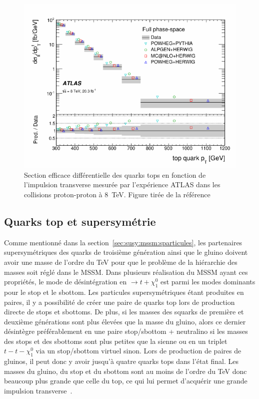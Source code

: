 \begin{figure}
  \centering
  \includegraphics{boosted_top_pt.pdf}
  \caption{Section efficace différentielle des quarks tops en fonction
    de l'impulsion transverse mesurée par l'expérience ATLAS dans les
    collisions proton-proton à 8~TeV. Figure tirée de la
    référence~\cite{atlas_collaboration_measurement_2015}}
  \label{fig:boosted_top_pt}
\end{figure}

\subsection{Quarks top et supersymétrie}

Comme mentionné dans la section~\ref{sec:susy:mssm:sparticules}, les
partenaires supersymétriques des quarks de troisième génération ainsi
que le gluino doivent avoir une masse de l'ordre du TeV pour que le
problème de la hiérarchie des masses soit réglé dans le MSSM.  Dans
plusieurs réalisation du MSSM ayant ces propriétés, le mode de
désintégration en $\rightarrow t + \chi_1^0$ est parmi les modes
dominants pour le stop et le sbottom. Les particules supersymétriques
étant produites en paires, il y a possibilité de créer une paire de
quarks top lors de production directe de stops et sbottoms. De plus,
si les masses des squarks de première et deuxième générations sont
plus élevées que la masse du gluino, alors ce dernier désintègre
préférablement en une paire stop/sbottom + neutralino si les masses
des stops et des sbottoms sont plus petites que la sienne ou en un
triplet $t-t-\chi_1^0$ via un stop/sbottom virtuel sinon.  Lors de
production de paires de gluinos, il peut donc y avoir jusqu'à quatre
quarks tops dans l'état final. Les masses du gluino, du stop et du
sbottom sont au moins de l'ordre du TeV donc beaucoup plus grande que
celle du top, ce qui lui permet d'acquérir une grande impulsion
transverse~\cite{bandyopadhyay_boosted_2011}.

